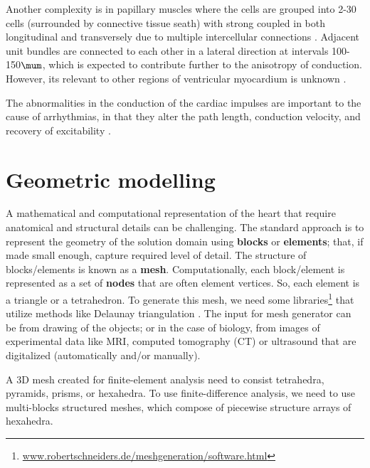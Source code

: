 \begin{framed}

Another complexity is in papillary muscles where the cells are grouped into 2-30
cells (surrounded by connective tissue seath) with strong coupled in both
longitudinal and transversely due to multiple intercellular connections
\citep{sommer1982}. Adjacent unit bundles are connected to each other in a
lateral direction at intervals 100-150$\mum$, which is expected to contribute
further to the anisotropy of conduction. However, its relevant to other regions
of ventricular myocardium is unknown \citep{peters1998}.
\end{framed}

The abnormalities in the conduction of the cardiac impulses are important to the
cause of arrhythmias, in that they alter the path length, conduction velocity,
and recovery of excitability \citep{spach1982, spach1986}.
 

\section{Geometric modelling}
\label{sec:geometric_modelling}

A mathematical and computational representation of the heart that require
anatomical and structural details can be challenging. The standard approach is
to represent the geometry of the solution domain using {\bf blocks} or {\bf
elements}; that, if made small enough, capture required level of detail. The
structure of blocks/elements is known as a {\bf mesh}. Computationally, each
block/element is represented as a set of {\bf nodes} that are often element
vertices. So, each element is a triangle or a tetrahedron. To generate this
mesh, we need some
libraries\footnote{\url{www.robertschneiders.de/meshgeneration/software.html}}
that utilize methods like Delaunay triangulation \citep{owen1998}. The input for
mesh generator can be from drawing of the objects; or in the case of biology,
from images of experimental data like MRI, computed tomography (CT) or
ultrasound that are digitalized (automatically and/or manually).


A 3D mesh created for finite-element analysis need to consist tetrahedra,
pyramids, prisms, or hexahedra. To use finite-difference analysis, we need to
use multi-blocks structured meshes, which compose of piecewise structure arrays
of hexahedra.

